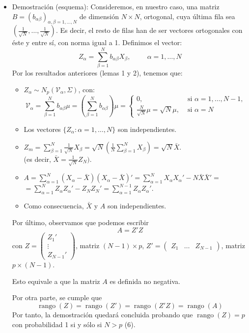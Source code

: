 \documentclass[11pt,a4paper]{article}
\begin{document}
\begin{itemize}
\item Demostración (esquema): Consideremos, en nuestro caso, una matriz $B = (b_{\alpha\beta})_{\alpha, \beta = 1, \dots, N}$ de dimensión $N \times N$, ortogonal, cuya última fila sea $(\frac{1}{\sqrt{N}}, \dots, \frac{1}{\sqrt{N}})$. Es decir, el resto de filas han de ser vectores ortogonales con éste y entre sí, con norma igual a 1. Definimos el vector:
$$Z_{\alpha} = \sum_{\beta=1}^{N} b_{\alpha\beta} X_{\beta}, \hspace{1cm} \alpha = 1, \dots, N$$
Por los resultados anteriores (lemas 1 y 2), tenemos que:
\begin{itemize}
\item $Z_{\alpha} \sim N_{p}(\mathcal{V}_{\alpha}, \Sigma)$, con:
$$\mathcal{V}_{\alpha} = \sum_{\beta=1}^{N}b_{\alpha\beta}\mu = (\sum_{\beta=1}^{N} b_{\alpha\beta}) \mu = \begin{cases}
0, & \text{ si } \alpha = 1, \dots, N-1, \\
\frac{N}{\sqrt{N}}\mu = \sqrt{N}\mu, & \text{ si } \alpha = N
\end{cases}$$

\item Los vectores $\{Z_{\alpha}: \alpha = 1, \dots, N\}$ son independientes.

\item $Z_{m} = \sum_{\beta=1}^{N} \frac{1}{\sqrt{N}}X_{\beta} = \sqrt{N}(\frac{1}{N} \sum_{\beta=1}^{N} X_{\beta}) = \sqrt{N}\bar{X}$. \\
(es decir, $\bar{X} = \frac{1}{\sqrt{N}}Z_{N})$.

\item $A = \sum_{\alpha=1}^{N}(X_{\alpha} - \bar{X})(X_{\alpha} - \bar{X})' = \sum_{\alpha=1}^{N} X_{\alpha}X_{\alpha}' - N\bar{X}\bar{X}' =$ \\ $= \sum_{\alpha=1}^{N} Z_{\alpha}Z_{\alpha}' - Z_{N}Z_{N}' = \sum_{\alpha=1}^{N-1}Z_{\alpha}Z_{\alpha}'$.

\item Como consecuencia, $\bar{X}$ y $A$ son independientes.
\end{itemize}
Por último, observamos que podemos escribir
$$A = Z'Z$$
con $Z = \begin{pmatrix} Z_{1}' \\ \vdots \\ Z_{N-1}' \end{pmatrix}$, matriz $(N-1) \times p$, $Z' = \begin{pmatrix} Z_{1} & \dots & Z_{N-1} \end{pmatrix}$, matriz $p \times (N-1)$.

Esto equivale a que la matriz $A$ es definida no negativa.

Por otra parte, se cumple que
$$\operatorname{rango}(Z) = \operatorname{rango}(Z') = \operatorname{rango}(Z'Z) = \operatorname{rango}(A)$$
Por tanto, la demostración quedará concluida probando que $\operatorname{rango}(Z) = p$ con probabilidad 1 si y sólo si $N > p$ (6).
\end{itemize}
\end{document}
